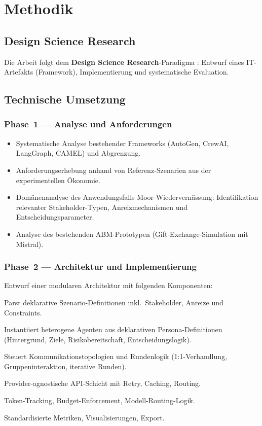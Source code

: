 \documentclass[12pt, a4paper]{article}
\begin{document}
\section{Methodik}

\subsection{Design Science Research}

Die Arbeit folgt dem \textbf{Design Science Research}-Paradigma \cite{hevner2004}: Entwurf eines IT-Artefakts (Framework), Implementierung und systematische Evaluation.

\subsection{Technische Umsetzung}

\subsubsection*{Phase~1 --- Analyse und Anforderungen}
\begin{itemize}
    \item Systematische Analyse bestehender Frameworks (AutoGen, CrewAI, LangGraph, CAMEL) und Abgrenzung.
    \item Anforderungserhebung anhand von Referenz-Szenarien aus der experimentellen Ökonomie.
    \item Domänenanalyse des Anwendungsfalls Moor-Wiedervernässung: Identifikation relevanter Stakeholder-Typen, Anreizmechanismen und Entscheidungsparameter.
    \item Analyse des bestehenden ABM-Prototypen (Gift-Exchange-Simulation mit Mistral).
\end{itemize}

\subsubsection*{Phase~2 --- Architektur und Implementierung}

Entwurf einer modularen Architektur mit folgenden Komponenten:
\begin{description}[style=nextline, leftmargin=1cm]
    \item[Scenario Engine] Parst deklarative Szenario-Definitionen inkl.\ Stakeholder, Anreize und Constraints.
    \item[Persona Manager] Instantiiert heterogene Agenten aus deklarativen Persona-Definitionen (Hintergrund, Ziele, Risikobereitschaft, Entscheidungslogik).
    \item[Interaction Orchestrator] Steuert Kommunikationstopologien und Rundenlogik (1:1-Verhandlung, Gruppeninteraktion, iterative Runden).
    \item[LLM Abstraction Layer] Provider-agnostische API-Schicht mit Retry, Caching, Routing.
    \item[Cost Controller] Token-Tracking, Budget-Enforcement, Modell-Routing-Logik.
    \item[Analysis Pipeline] Standardisierte Metriken, Visualisierungen, Export.
\end{description}
\end{document}
